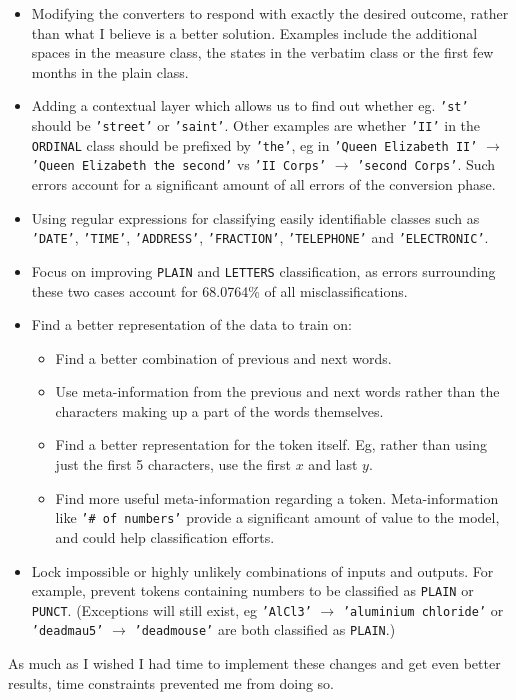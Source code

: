 \documentclass[a4paper, 9pt]{extarticle}
\newcommand{\code}{\texttt}
\newcommand{\str}[1]{\texttt{'#1'}}
\begin{document}
\begin{itemize}
    \itemsep-0.3em
    \item Modifying the converters to respond with exactly the desired outcome, rather than what I believe is a better solution. Examples include the additional spaces in the measure class, the states in the verbatim class or the first few months in the plain class.
    \item Adding a contextual layer which allows us to find out whether eg. \str{st} should be \str{street} or \str{saint}. Other examples are whether \str{II} in the \code{ORDINAL} class should be prefixed by \str{the}, eg in \str{Queen Elizabeth II} $\to$ \str{Queen Elizabeth the second} vs \str{II Corps} $\to$ \str{second Corps}. Such errors account for a significant amount of all errors of the conversion phase.
    \item Using regular expressions for classifying easily identifiable classes such as \str{DATE}, \str{TIME}, \str{ADDRESS}, \str{FRACTION}, \str{TELEPHONE} and \str{ELECTRONIC}.
    \item Focus on improving \code{PLAIN} and \code{LETTERS} classification, as errors surrounding these two cases account for 68.0764\% of all misclassifications.
    \item Find a better representation of the data to train on:
    \begin{itemize}
        \item Find a better combination of previous and next words.
        \item Use meta-information from the previous and next words rather than the characters making up a part of the words themselves.
        \item Find a better representation for the token itself. Eg, rather than using just the first 5 characters, use the first $x$ and last $y$.
        \item Find more useful meta-information regarding a token. Meta-information like \str{\# of numbers} provide a significant amount of value to the model, and could help classification efforts.
    \end{itemize}
    \item Lock impossible or highly unlikely combinations of inputs and outputs. For example, prevent tokens containing numbers to be classified as \code{PLAIN} or \code{PUNCT}. (Exceptions will still exist, eg \str{AlCl3} $\to$ \str{aluminium chloride} or \str{deadmau5} $\to$ \str{deadmouse} are both classified as \code{PLAIN}.)
\end{itemize}
As much as I wished I had time to implement these changes and get even better results, time constraints prevented me from doing so.
\end{document}
